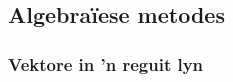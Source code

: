 % 
% 
% 
% 
% 
% 
% 

\subsection*{Algebraïese metodes}
\subsubsection*{Vektore in  'n reguit lyn}

